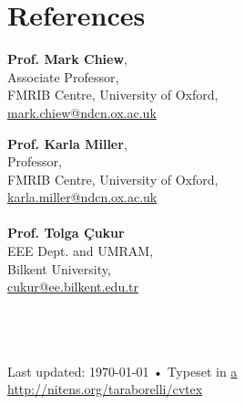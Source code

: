 \documentclass[10pt, a4paper]{article}
\begin{document}
\section*{References}
\begin{multicols}{2}

\textbf{Prof. Mark Chiew},\\
Associate Professor,\\
FMRIB Centre, University of Oxford, \\
\href{mailto:mark.chiew@ndcn.ox.ac.uk}{mark.chiew@ndcn.ox.ac.uk}

\textbf{Prof. Karla Miller},\\
Professor,\\
FMRIB Centre, University of Oxford, \\
\href{mailto:karla.miller@ndcn.ox.ac.uk}{karla.miller@ndcn.ox.ac.uk}
\\
\\
\textbf{Prof. Tolga \c{C}ukur}\\
EEE Dept. and UMRAM, \\
Bilkent University, \\
\href{mailto:cukur@ee.bilkent.edu.tr}{cukur@ee.bilkent.edu.tr}
\\
\\
\\
\\


\end{multicols}
\vfill{}

\begin{center}
{\scriptsize  Last updated: \today\- •\- 
Typeset in \href{http://nitens.org/taraborelli/cvtex}{a
}\\
\href{http://nitens.org/taraborelli/cvtex}{http://nitens.org/taraborelli/cvtex}}
\end{center}
\end{document}
